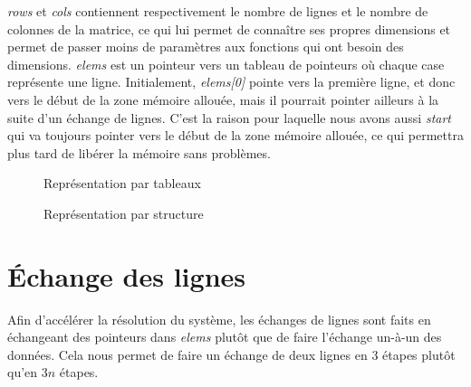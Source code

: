\documentclass[10pt]{article}
\begin{document}
\emph{rows} et \emph{cols} contiennent respectivement le nombre de
lignes et le nombre de colonnes de la matrice, ce qui lui permet de
connaître ses propres dimensions et permet de passer moins de
paramètres aux fonctions qui ont besoin des dimensions.  \emph{elems}
est un pointeur vers un tableau de pointeurs où chaque case représente
une ligne.  Initialement, \emph{elems[0]} pointe vers la première
ligne, et donc vers le début de la zone mémoire allouée, mais il
pourrait pointer ailleurs à la suite d'un échange de lignes.  C'est la
raison pour laquelle nous avons aussi \emph{start} qui va toujours
pointer vers le début de la zone mémoire allouée, ce qui permettra
plus tard de libérer la mémoire sans problèmes.

\begin{figure}[h]
  \caption{Représentation par tableaux}
\end{figure}

\begin{figure}[h]
  \caption{Représentation par structure}
\end{figure}

\section{Échange des lignes}

Afin d'accélérer la résolution du système, les échanges de lignes sont
faits en échangeant des pointeurs dans \emph{elems} plutôt que de
faire l'échange un-à-un des données.  Cela nous permet de faire un
échange de deux lignes en 3 étapes plutôt qu'en $3n$ étapes.
\end{document}
